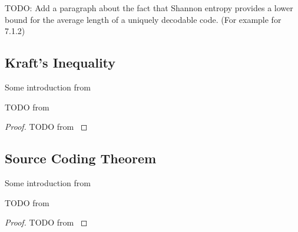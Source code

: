 TODO: Add a paragraph about the fact that  Shannon entropy provides a lower bound for the average length of a uniquely decodable code. (For example for \cite{KolmogorovComplexity} 7.1.2)

\subsection{Kraft's Inequality}

Some introduction from \cite{ElementsofInformationTheory}

\begin{theorem}\label{thm:kraft_inequality}
    TODO from \cite{ElementsofInformationTheory}
\end{theorem}
\begin{proof}
    TODO from \cite{ElementsofInformationTheory}
\end{proof}

\subsection{Source Coding Theorem}

Some introduction from \cite{ElementsofInformationTheory,Shannon1948,KolmogorovComplexity,han2002mathematics}

\begin{theorem}\label{thm:source_coding_theorem}
    TODO from \cite{ElementsofInformationTheory,han2002mathematics}
\end{theorem}
\begin{proof}
    TODO from \cite{ElementsofInformationTheory,han2002mathematics}
\end{proof}







\clearpage
